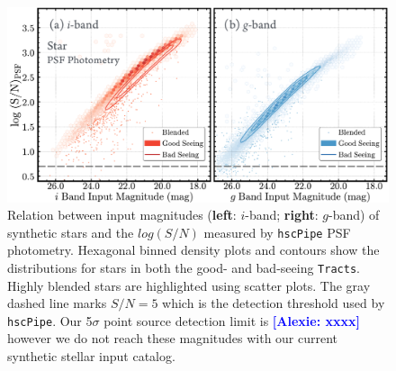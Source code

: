 \documentclass[useamsfonts]{pasj01}
\newcommand{\alexie}[1]{\textcolor{blue}{\textbf{[Alexie: #1]}}}
\def\hscpipe{\texttt{hscPipe}}
\def\tracts{\texttt{Tracts}}
\begin{document}
\begin{figure}
    \begin{center}
        \includegraphics[width=\textwidth]{fig/synpipe_psf_sn}
    \end{center}
    \caption{
        Relation between input magnitudes (\textbf{left}: $i$-band; \textbf{right}:
        $g$-band) of synthetic stars and the $log(S/N)$ measured by \hscpipe{} PSF
        photometry.
        Hexagonal binned density plots and contours show the distributions for
        stars in both the good- and bad-seeing \tracts{}. Highly blended stars are highlighted using scatter plots.
        The gray dashed line marks $S/N = 5$ which is the detection threshold used by \hscpipe{}.  Our 5$\sigma$  point source detection limit  is \alexie{xxxx} however we do not reach these magnitudes with our current synthetic stellar input catalog.
        }
    \label{fig:star_sn}
\end{figure}
\end{document}
